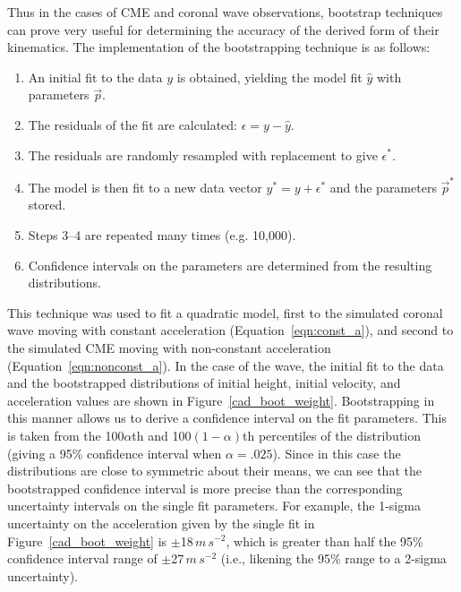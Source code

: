 \documentclass[structabstract]{aa}
\begin{document}
Thus in the cases of CME and coronal wave observations, bootstrap techniques can prove very useful for determining the accuracy of the derived form of their kinematics. The implementation of the bootstrapping technique is as follows:
\begin{enumerate}
\item An initial fit to the data $y$ is obtained, yielding the model fit $\hat{y}$ with parameters $\vec{p}$.
\item The residuals of the fit are calculated: $\epsilon = y - \hat{y}$.
\item The residuals are randomly resampled with replacement to give $\epsilon^*$.
\item The model is then fit to a new data vector $y^* = y + \epsilon^*$ and the parameters $\vec{p}^*$ stored.
\item Steps 3--4 are repeated many times (e.g. 10,000).
\item Confidence intervals on the parameters are determined from the resulting distributions.
\end{enumerate}
This technique was used to fit a quadratic model, first to the simulated coronal wave moving with constant acceleration (Equation~\ref{eqn:const_a}), and second to the simulated CME moving with non-constant acceleration (Equation~\ref{eqn:nonconst_a}). In the case of the wave, the initial fit to the data and the bootstrapped distributions of initial height, initial velocity, and acceleration values are shown in Figure~\ref{cad_boot_weight}. Bootstrapping in this manner allows us to derive a confidence interval on the fit parameters. This is taken from the 100$\alpha$th and 100$\left(1-\alpha\right)$th percentiles of the distribution (giving a 95\% confidence interval when $\alpha=.025$). Since in this case the distributions are close to symmetric about their means, we can see that the bootstrapped confidence interval is more precise than the corresponding uncertainty intervals on the single fit parameters. For example, the 1-sigma uncertainty on the acceleration given by the single fit in Figure~\ref{cad_boot_weight} is $\pm$18$\,m\,s^{-2}$, which is greater than half the 95\% confidence interval range of $\pm$27$\,m\,s^{-2}$ (i.e., likening the 95\% range to a 2-sigma uncertainty). 
\end{document}
